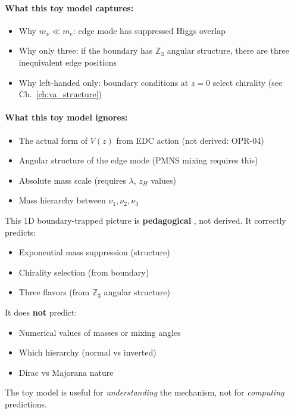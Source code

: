 \paragraph{What this toy model captures:}
\begin{itemize}[nosep]
    \item[\ding{51}] Why $m_\nu \ll m_e$: edge mode has suppressed Higgs overlap
    \item[\ding{51}] Why only three: if the boundary has $\mathbb{Z}_3$ angular structure,
          there are three inequivalent edge positions
    \item[\ding{51}] Why left-handed only: boundary conditions at $z = 0$ select chirality
          (see Ch.~\ref{ch:va_structure})
\end{itemize}

\paragraph{What this toy model ignores:}
\begin{itemize}[nosep]
    \item[$\times$] The actual form of $V(z)$ from EDC action (not derived: OPR-04)
    \item[$\times$] Angular structure of the edge mode (PMNS mixing requires this)
    \item[$\times$] Absolute mass scale (requires $\lambda$, $z_H$ values)
    \item[$\times$] Mass hierarchy between $\nu_1, \nu_2, \nu_3$
\end{itemize}

\begin{tcolorbox}[colback=yellow!5!white, colframe=yellow!60!black,
    title=\textbf{Toy Model Status}]
This 1D boundary-trapped picture is \textbf{pedagogical} \tagP{}, not derived.
It correctly predicts:
\begin{itemize}[nosep]
    \item Exponential mass suppression (structure)
    \item Chirality selection (from boundary)
    \item Three flavors (from $\mathbb{Z}_3$ angular structure)
\end{itemize}
It does \textbf{not} predict:
\begin{itemize}[nosep]
    \item Numerical values of masses or mixing angles
    \item Which hierarchy (normal vs inverted)
    \item Dirac vs Majorana nature
\end{itemize}
The toy model is useful for \emph{understanding} the mechanism, not for
\emph{computing} predictions.
\end{tcolorbox}

